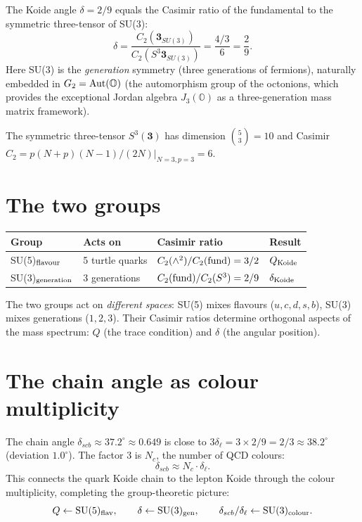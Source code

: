 \documentclass[11pt]{article}
\begin{document}
The Koide angle $\delta = 2/9$ equals the Casimir ratio
of the fundamental to the symmetric three-tensor of SU(3):
\begin{equation}
  \delta = \frac{C_2(\mathbf{3}_{SU(3)})}{C_2(S^3\mathbf{3}_{SU(3)})}
  = \frac{4/3}{6} = \frac{2}{9}.
\end{equation}
Here SU(3) is the \emph{generation} symmetry (three generations
of fermions), naturally embedded in $G_2 = {\rm Aut}(\mathbb{O})$
(the automorphism group of the octonions, which provides the
exceptional Jordan algebra $J_3(\mathbb{O})$ as a three-generation
mass matrix framework).

The symmetric three-tensor $S^3(\mathbf{3})$ has
dimension $\binom{5}{3} = 10$ and Casimir
$C_2 = p(N+p)(N-1)/(2N)|_{N=3,p=3} = 6$.

\section{The two groups}

\begin{center}
\begin{tabular}{@{}l l l l@{}}
\toprule
Group & Acts on & Casimir ratio & Result \\
\midrule
SU(5)$_{\rm flavour}$ & 5 turtle quarks
  & $C_2(\wedge^2)/C_2(\rm fund) = 3/2$ & $Q_{\rm Koide}$ \\
SU(3)$_{\rm generation}$ & 3 generations
  & $C_2({\rm fund})/C_2(S^3) = 2/9$ & $\delta_{\rm Koide}$ \\
\bottomrule
\end{tabular}
\end{center}

\noindent
The two groups act on \emph{different spaces}: SU(5)
mixes flavours ($u,c,d,s,b$), SU(3) mixes generations
($1,2,3$).  Their Casimir ratios determine orthogonal
aspects of the mass spectrum: $Q$ (the trace condition)
and $\delta$ (the angular position).

\section{The chain angle as colour multiplicity}

The chain angle $\delta_{scb} \approx 37.2^\circ \approx 0.649$
is close to $3\delta_\ell = 3 \times 2/9 = 2/3 \approx 38.2^\circ$
(deviation $1.0^\circ$).  The factor $3$ is $N_c$, the number of
QCD colours:
\begin{equation}
  \delta_{scb} \approx N_c \cdot \delta_\ell.
\end{equation}
This connects the quark Koide chain to the lepton Koide through
the colour multiplicity, completing the group-theoretic picture:
\begin{equation}
  Q \leftarrow \text{SU}(5)_{\rm flav},\qquad
  \delta \leftarrow \text{SU}(3)_{\rm gen},\qquad
  \delta_{scb}/\delta_\ell \leftarrow \text{SU}(3)_{\rm colour}.
\end{equation}
\end{document}
